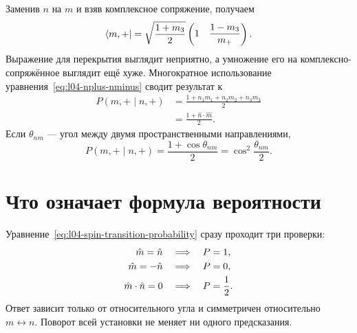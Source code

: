 Заменив \(n\) на \(m\) и взяв комплексное сопряжение, получаем
\begin{equation}
  \left\langle m,+\right\rvert
  =
  \sqrt{\frac{1+m_3}{2}}
  \begin{pmatrix}
    1&
    \dfrac{1-m_3}{m_+}
  \end{pmatrix}.
\end{equation}
Выражение для перекрытия выглядит неприятно, а умножение его на комплексно-сопряжённое выглядит ещё хуже. Многократное использование уравнения~\eqref{eq:l04-nplus-nminus} сводит результат к
\begin{equation}
  \begin{aligned}
    P(m,+\mid n,+)
    &=\frac{1+n_1m_1+n_2m_2+n_3m_3}{2}\\
    &=\frac{1+\hat n\cdot\hat m}{2}.
  \end{aligned}
  \label{eq:l04-spin-transition-probability}
\end{equation}
Если \(\theta_{nm}\) — угол между двумя пространственными направлениями,
\begin{equation}
  P(m,+\mid n,+)
  =
  \frac{1+\cos\theta_{nm}}{2}
  =
  \cos^2\frac{\theta_{nm}}{2}.
  \label{eq:l04-half-angle-probability}
\end{equation}

\begin{classroomqa}
\end{classroomqa}

\section{Что означает формула вероятности}

Уравнение~\eqref{eq:l04-spin-transition-probability} сразу проходит три проверки:
\begin{align}
  \hat m=\hat n
  &\quad\Longrightarrow\quad P=1,
  \notag\\
  \hat m=-\hat n
  &\quad\Longrightarrow\quad P=0,
  \notag\\
  \hat m\cdot\hat n=0
  &\quad\Longrightarrow\quad P=\frac12.
\end{align}
Ответ зависит только от относительного угла и симметричен относительно \(m\leftrightarrow n\). Поворот всей установки не меняет ни одного предсказания.

